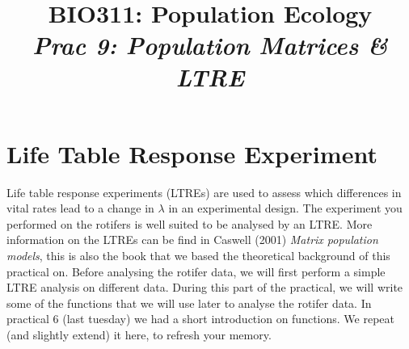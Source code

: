 \documentclass{article}\usepackage[]{graphicx}\usepackage[]{color}
\title{BIO311: Population Ecology\\ \textit{Prac 9: Population Matrices \& LTRE}}
\begin{document}




\maketitle
\tableofcontents
\vspace{3cm}
\newpage

\section{Life Table Response Experiment}
Life table response experiments (LTREs) are used to assess which  differences in vital rates lead to a change in $\lambda$ in an experimental design. The experiment you performed on the rotifers is well suited to be analysed by an LTRE. More information on the LTREs can be find in Caswell (2001) \textit{Matrix population models}, this is also the book that we based the theoretical background of this practical on. Before analysing the rotifer data, we will first perform a simple LTRE analysis on different data. During this part of the practical, we will write some of the functions that we will use later to analyse the rotifer data. In practical 6 (last tuesday) we had a short introduction on functions. We repeat (and slightly extend) it here, to refresh your memory.
\end{document}
